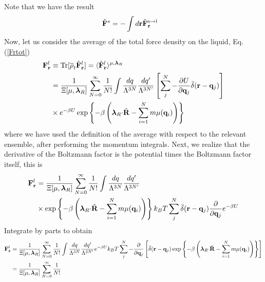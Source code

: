 \documentclass[b5paper,openright,11pt]{book}
\begin{document}
\begin{appendices}
Note that we have the result
\begin{align}
    \hat{\bf F}^s&= -\int d{\bf r}\hat{\bf F}^{\rm s\to l}_{\bf r}
\end{align}
Now, let us consider the average of the total force density on the liquid, Eq. (\ref{Frtot})
\begin{align}
{\bf F}^l_{\bf r} &\equiv{\rm Tr}[\overline{\rho}_t \hat{\bf F}^l_{\bf r}] =
 \langle \hat{\bf F}^l_{\bf r}\rangle^{\mu,\boldsymbol{\lambda}_R}
\nonumber\\
&=
\frac{1}{\Xi[\mu,\boldsymbol{\lambda}_R]}
 \sum_{N=0}^\infty \frac{1}{N!}
\int \frac{dq}{\Lambda^{3N}}\frac{dq'}{\Lambda^{3N'}}
\left[\sum^{N}_{j}-\frac{\partial U}{\partial {\bf q}_{j}}\bar{\delta}({\bf r}-{\bf q}_j)\right]
\nonumber\\
&\times e^{-\beta U}
\exp\left\{-\beta  \left( \boldsymbol{\lambda}_R{\cdot}\hat{\bf R}
-\sum_{i=1}^N m\mu({\bf q}_i)\right)\right\}
\end{align}
where we have  used the definition of the average  with respect to the
relevant ensemble,  after performing the momentum  integrals. Next, we
realize that the  derivative of the Boltzmann factor  is the potential
times the Boltzmann factor itself, this is
\begin{align}
{\bf F}^l_{\bf r}&=
\frac{1}{\Xi[\mu,\boldsymbol{\lambda}_R]}
 \sum_{N=0}^\infty \frac{1}{N!}
\int \frac{dq}{\Lambda^{3N}}\frac{dq'}{\Lambda^{3N'}}
\nonumber\\
&\times \exp\left\{-\beta  \left(\boldsymbol{\lambda}_R{\cdot}\hat{\bf R}
-\sum_{i=1}^N m\mu({\bf   q}_i)\right)\right\}
k_BT\sum^{N}_{j}\bar{\delta}({\bf r}-{\bf q}_j)\frac{\partial }{\partial {\bf q}_{j}}e^{-\beta U}
\end{align}
Integrate by parts to obtain
\begin{align}
{\bf F}^l_{\bf r}&=
\frac{1}{\Xi[\mu,\boldsymbol{\lambda}_R]}
 \sum_{N=0}^\infty \frac{1}{N!}
\int \frac{dq}{\Lambda^{3N}}\frac{dq'}{\Lambda^{3N'}}
e^{-\beta U}
k_BT\sum^{N}_{j}-\frac{\partial }{\partial {\bf q}_{j}}\left[\bar{\delta}({\bf r}-{\bf q}_j)
\exp\left\{-\beta  \left( \boldsymbol{\lambda}_R{\cdot}\hat{\bf R}
-\sum_{i=1}^N m\mu({\bf q}_i)\right)\right\}\right]
\nonumber\\
&=
\frac{1}{\Xi[\mu,\boldsymbol{\lambda}_R]}
 \sum_{N=0}^\infty \frac{1}{N!}

\end{align}
\end{appendices}
\end{document}
